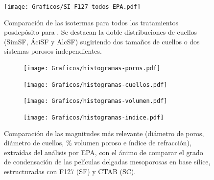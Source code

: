 			\clearpage

			\begin{figure}[th!]
		 	   	   \begin{center}
		 	   	   \texttt{[image: Graficos/SI\_F127\_todos\_EPA.pdf]}
			   	   \caption[Comparación PEA tratamientos alternativos (F127)]{Comparación de las isotermas para todos los tratamientos posdepósito para \pdmF. Se destacan la doble distribuciones de cuellos (SimSF, ÁciSF y AlcSF) sugiriendo dos tamaños de cuellos o dos sistemas porosos independientes.}
				   \label{fig:todos_EPA_F127}	
				   \end{center}
				   \end{figure}	

				   \begin{figure}[hb!]
				 	   	    
				 	   	    \begin{subfigure}[t]{0.5\textwidth}
				        	\texttt{[image: Graficos/histogramas-poros.pdf]}
				       		\end{subfigure}
				         	\begin{subfigure}[t]{0.5\textwidth}
				        	\texttt{[image: Graficos/histogramas-cuellos.pdf]}
				       		\end{subfigure}
				         	 \begin{subfigure}[t]{0.5\textwidth}
				        	\texttt{[image: Graficos/histogramas-volumen.pdf]}
				       		\end{subfigure}
				         	\begin{subfigure}[t]{0.5\textwidth}
				        	\texttt{[image: Graficos/histogramas-indice.pdf]}
				       		\end{subfigure}
				     		\caption[Comparación del grado de condensación de \pdm]{Comparación de las magnitudes más relevante (diámetro de poros, diámetro de cuellos, \% volumen poroso e índice de refracción), extraídas del análisis por EPA, con el ánimo de comparar el grado de condensación de las películas delgadas mesoporosas en base sílice, estructuradas con F127 (SF) y CTAB (SC).}
				     		\label{fig:histogramas}
				     		\end{figure}
		
		\pagebreak

